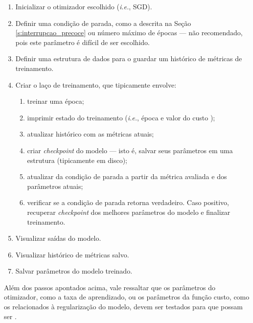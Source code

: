 \begin{enumerate}
\begin{enumerate}
\begin{enumerate}
            \end{enumerate}
          \item Inicializar o otimizador escolhido (\textit{i.e.}, SGD).
          \item Definir uma condição de parada, como a descrita na Seção \ref{s:interrupcao_precoce} ou número máximo de épocas --- não recomendado, pois este parâmetro é difícil de ser escolhido.
          \item Definir uma estrutura de dados para o guardar um histórico de métricas de treinamento.
          \item Criar o laço de treinamento, que tipicamente envolve:
            \begin{enumerate}
              \item treinar uma época;
              \item imprimir \DIFaddbegin {}\DIFaddend estado do treinamento (\textit{i.e.}, época e valor do custo \DIFaddbegin {}\DIFaddend );
              \item atualizar histórico com as métricas atuais;
              \item criar \textit{checkpoint} do modelo --- isto é, salvar seus parâmetros em uma estrutura (tipicamente em disco);
              \item atualizar da condição de parada a partir da métrica avaliada e dos parâmetros atuais;
              \item verificar se a condição de parada retorna verdadeiro. Caso positivo, recuperar \DIFaddbegin {}\DIFaddend \textit{checkpoint} dos melhores parâmetros do modelo e finalizar treinamento.
            \end{enumerate}
          \item Visualizar saídas do modelo.
          \item Visualizar histórico de métricas salvo\DIFaddbegin {}\DIFaddend .
          \item Salvar parâmetros do modelo treinado.
        \end{enumerate}
    \end{enumerate}

    Além dos passos apontados acima, vale ressaltar que os parâmetros do otimizador, como a taxa de aprendizado, ou os parâmetros da função custo, como os relacionados à regularização do modelo, devem ser testados para que possam ser \DIFdelbegin {}\DIFdelend \DIFaddbegin {}\DIFaddend .


